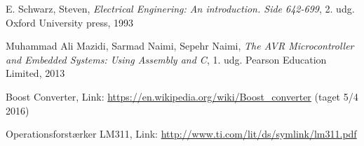 \begin{thebibliography}{9}

  E. Schwarz, Steven,
  \emph{Electrical Enginering: An introduction. Side 642-699},
  2. udg.
  Oxford University press,
  1993

    Muhammad Ali Mazidi, Sarmad Naimi, Sepehr Naimi,
    \emph{The AVR Microcontroller and Embedded Systems: Using Assembly and C},
    1. udg.
    Pearson Education Limited,
    2013

      Boost Converter, Link:
    \url{https://en.wikipedia.org/wiki/Boost_converter}
      (taget 5/4 2016)


        Operationsforstærker LM311, Link:
      \url{http://www.ti.com/lit/ds/symlink/lm311.pdf}


\end{thebibliography}
